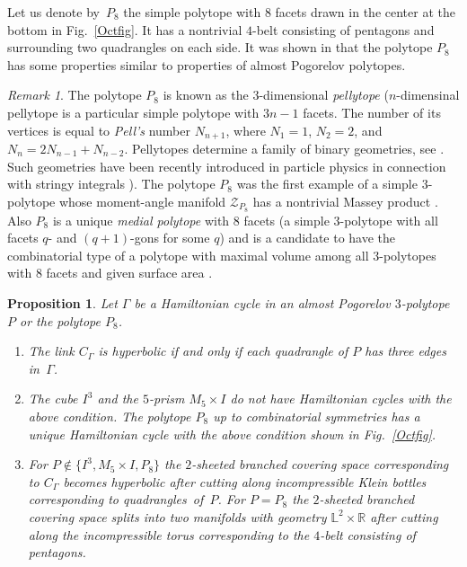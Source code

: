 \documentclass[12pt]{amsart}
\newtheorem{proposition}[formula]{Proposition}
\theoremstyle{definition}
\theoremstyle{remark}
\newtheorem{remark}[formula]{Remark}
\begin{document}
Let us denote by~$P_8$ the simple polytope  with $8$ facets drawn in the center at the bottom in Fig.~\ref{Octfig}.  It has a 
nontrivial $4$-belt consisting of pentagons and surrounding two quadrangles on each side. It was shown in \cite{E19} that the 
polytope $P_8$ has some properties similar to properties of almost Pogorelov polytopes. 
\begin{remark}
The polytope $P_8$ is known as the $3$-dimensional {\it pellytope} ($n$-dimensinal pellytope is a particular 
simple polytope with $3n-1$ facets. The number of its vertices is equal to {\it Pell's} number $N_{n+1}$, where
$N_1=1$, $N_2=2$, and $N_n=2N_{n-1}+N_{n-2}$.  Pellytopes determine a family of binary geometries, see \cite{BTTM25}. 
Such geometries have  been recently introduced in particle physics in connection with stringy integrals \cite{AHLT23}).
The polytope $P_8$ was the first example of a simple $3$-polytope whose moment-angle manifold 
$\mathcal{Z}_{P_8}$ has a nontrivial Massey product \cite{B03}.  Also $P_8$ is a unique {\it medial polytope} 
with $8$ facets (a simple $3$-polytope with all  facets $q$- and $(q+1)$-gons for some $q$)  and is a candidate to have the combinatorial type 
of a polytope with maximal volume among all $3$-polytopes with $8$ facets and given surface area \cite{G35}.  
\end{remark}
\begin{proposition}\label{APHC}
Let $\Gamma$ be a Hamiltonian cycle in an almost Pogorelov $3$-polytope $P$ or the polytope $P_8$. 
\begin{enumerate}
\item The link $C_\Gamma$ is hyperbolic if and only if each quadrangle of $P$ has three edges in~$\Gamma$.
\item The cube $I^3$ and the $5$-prism $M_5\times I$ do not have Hamiltonian cycles with the above condition. 
The polytope $P_8$ up to combinatorial symmetries has a unique Hamiltonian cycle with the above condition shown in Fig.~\ref{Octfig}.
\item For $P\notin \{I^3, M_5\times I, P_8\}$ the $2$-sheeted branched covering space corresponding to $C_\Gamma$ becomes hyperbolic after cutting along incompressible Klein bottles corresponding to quadrangles~of~$P$.  For $P=P_8$ the $2$-sheeted branched covering space splits into two manifolds with geometry $\mathbb L^2\times \mathbb R$ after cutting along the incompressible torus corresponding to the $4$-belt consisting of pentagons. 
\end{enumerate}
\end{proposition}
\end{document}
